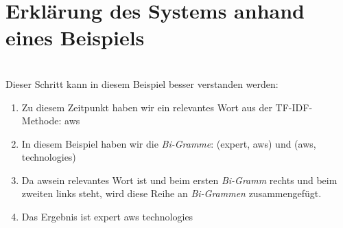 \section{Erklärung des Systems anhand eines Beispiels}
\\
Dieser Schritt kann in diesem Beispiel besser verstanden werden:\\
\begin{enumerate}
	\item Zu diesem Zeitpunkt haben wir ein relevantes Wort aus der TF-IDF-Methode: \grqq aws\grqq
	\item In diesem Beispiel haben wir die \emph{Bi-Gramme}: (\grqq expert\grqq, \grqq aws\grqq) und (\grqq aws\grqq, \grqq technologies\grqq)
	\item Da \grqq aws\grqq ein relevantes Wort ist und beim ersten \emph{Bi-Gramm} rechts und beim zweiten links steht, wird diese Reihe an \emph{Bi-Grammen} zusammengefügt.
	\item Das Ergebnis ist \grqq expert aws technologies\grqq
\end{enumerate}